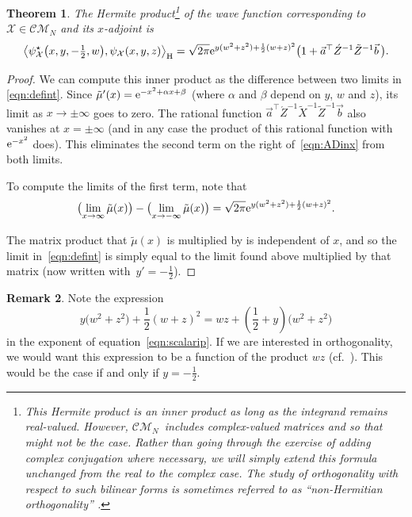 \documentclass[10pt,a4paper]{amsart}
\numberwithin{equation}{section}
\newtheorem{Theorem}{Theorem}[section]
\theoremstyle{definition}
\newtheorem{Remark}[Theorem]{Remark}
\def\psistar{\psi^{\star}}
\def\X{\mathcal{X}}
\def\CM{\mathcal{C\!M}}
\begin{document}
\begin{Theorem}\label{thm:scalarip} The Hermite product\footnote{This
 Hermite product is an inner product as long as the integrand remains
 real-valued. However, $\CM_N$~includes complex-valued matrices
 and so that might not be the case. Rather than going through the
 exercise of adding complex conjugation where necessary, we will
 simply extend this formula unchanged from the real to the complex
 case.
 The study of orthogonality with respect to such bilinear forms is
 sometimes referred to as ``non-Hermitian
 orthogonality'' \cite{BarYat}.}
 of the wave
 function corresponding to $\X\in\CM_N$ and
 its $x$-adjoint is
\begin{equation} \label{eqn:scalarip}\bigl\langle
\relax{\psistar_{\X}\bigl(x,y,-\tfrac{1}{2},w\bigr)},\psi_{\X}(x,y,z)\bigr\rangle_{\rm H}=
 \sqrt{2\pi } {\rm e}^{y
 (w^2+z^2)+\frac{
 1}{2} (w+z)^2}
 \bigl(1+\vec a^{\top}\acute Z^{-1}\tilde Z^{-1}\vec b\,\bigr).
\end{equation}
\end{Theorem}
\begin{proof}
We can compute this inner product as the difference between two limits
in \eqref{eqn:defint}.
Since $\tilde\mu'(x)={\rm e}^{-x^2+\alpha x+\beta}$ (where $\alpha$ and
$\beta$ depend on $y$, $w$ and $z$), its limit as $x\to\pm\infty$
goes to zero. The rational function $\vec a^{\top}\acute
Z^{-1}\tilde X^{-1}\tilde Z^{-1}\vec b$ also vanishes at $x=\pm\infty$
(and in any case the product of this rational function with ${\rm e}^{-x^2}$
does). This eliminates the second term on the right of~\eqref{eqn:ADinx} from both limits.

To compute the limits of the first term, note that
\[
\bigl(\lim_{x\to\infty}\tilde\mu(x)\bigr)-
\bigl(\lim_{x\to-\infty}\tilde\mu(x)\bigr)=
 \sqrt{{2\pi} } {\rm e}^{y
 (w^2+z^2)+\frac{
 1}{2} (w+z)^2}.
 \]

The matrix product that $\tilde\mu(x)$ is multiplied by is independent of $x$,
and so the limit in~\eqref{eqn:defint} is simply equal to the limit
found above multiplied by that matrix (now written with~${y'=-\frac{1}{2}}$).
\end{proof}

\begin{Remark}\label{rem:yval}
 Note the expression \[y
 \bigl(w^2+z^2\bigr)+\frac{
 1}{2} (w+z)^2=wz+\left(\frac12+y\right)\bigl(w^2+z^2\bigr)
\] in the exponent of equation~\eqref{eqn:scalarip}. If we are
interested in orthogonality, we would want this expression to be a
function of the product $wz$ (cf.~\cite{twofacts}). This would be the case if and only if
$y=-\frac{1}{2}$.
\end{Remark}
\end{document}
